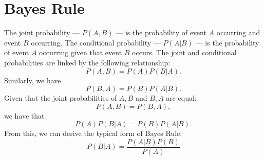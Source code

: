 \chapter{Bayes Rule}\label{ch:bayes}

The joint probability --- $P(A, B)$ --- is the probability of event $A$ occurring
and event $B$ occurring.
The conditional probability --- $P(A | B)$ --- is the probability of event $A$
occurring given that event $B$ occurs.
The joint and conditional probabilities are linked by the following relationship:
\begin{equation}
    P(A, B) = P(A) P(B | A).
\end{equation}
Similarly, we have
\begin{equation}
    P(B, A) = P(B) P(A | B).
\end{equation}
Given that the joint probabilities of $A, B$ and $B, A$ are equal:
\begin{equation*}
    P(A, B) = P(B, A),
\end{equation*}
we have that
\begin{equation}
    P(A) P(B | A) = P(B) P(A | B).
\end{equation}
From this, we can derive the typical form of Bayes Rule:
\begin{equation}
    P(B | A) = \frac{P(A | B) P(B)}{P(A)}
\end{equation}
